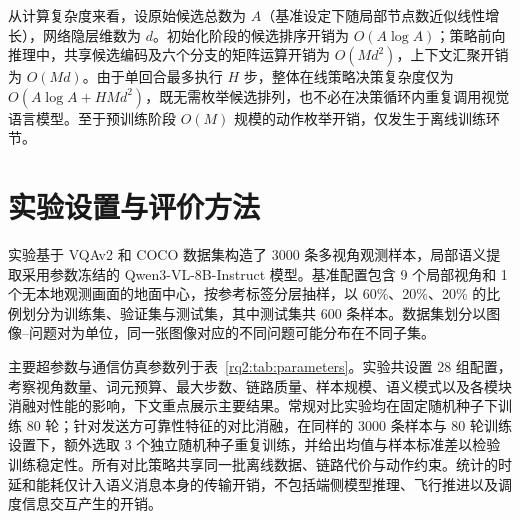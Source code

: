 \begingroup
{}
从计算复杂度来看，设原始候选总数为 $A$（基准设定下随局部节点数近似线性增长），网络隐层维数为 $d$。初始化阶段的候选排序开销为 $O(A\log A)$；策略前向推理中，共享候选编码及六个分支的矩阵运算开销为 $O(Md^2)$，上下文汇聚开销为 $O(Md)$。由于单回合最多执行 $H$ 步，整体在线策略决策复杂度仅为 $O(A\log A+HMd^2)$，既无需枚举候选排列，也不必在决策循环内重复调用视觉语言模型。至于预训练阶段 $O(M)$ 规模的动作枚举开销，仅发生于离线训练环节。
\par
\endgroup

\section{实验设置与评价方法}
\label{rq2:sec:setup}

实验基于 VQAv2 和 COCO 数据集构造了 3000 条多视角观测样本，局部语义提取采用参数冻结的 Qwen3-VL-8B-Instruct 模型。基准配置包含 9 个局部视角和 1 个无本地观测画面的地面中心，按参考标签分层抽样，以 60\%、20\%、20\% 的比例划分为训练集、验证集与测试集，其中测试集共 600 条样本。数据集划分以图像--问题对为单位，同一张图像对应的不同问题可能分布在不同子集。

主要超参数与通信仿真参数列于表~\ref{rq2:tab:parameters}。实验共设置 28 组配置，考察视角数量、词元预算、最大步数、链路质量、样本规模、语义模式以及各模块消融对性能的影响，下文重点展示主要结果。常规对比实验均在固定随机种子下训练 80 轮；针对发送方可靠性特征的对比消融，在同样的 3000 条样本与 80 轮训练设置下，额外选取 3 个独立随机种子重复训练，并给出均值与样本标准差以检验训练稳定性。所有对比策略共享同一批离线数据、链路代价与动作约束。统计的时延和能耗仅计入语义消息本身的传输开销，不包括端侧模型推理、飞行推进以及调度信息交互产生的开销。

